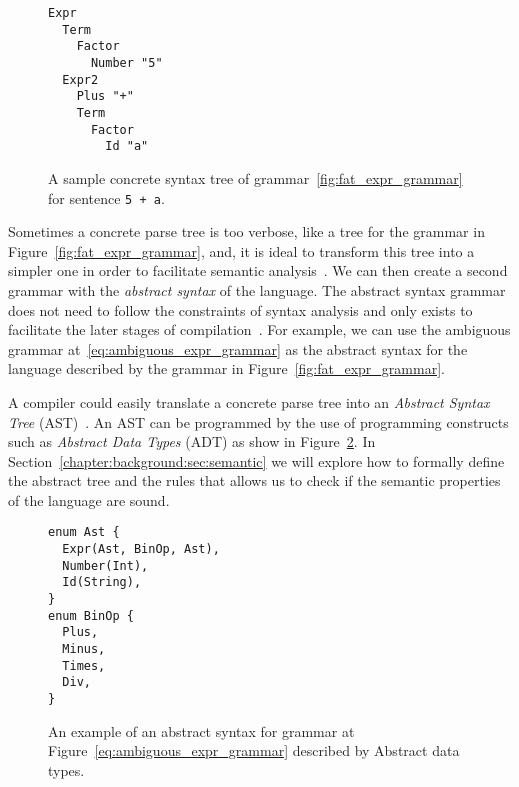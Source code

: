 \documentclass[
  oneside,
  english,
  coorientadorbanca,
  noabntexcite
]{ufsc-thesis-rn46-2019}
\newcommand{\code}[1]{\texttt{#1}}
\begin{document}
\begin{figure}[ht]
  \centering
  \begin{minipage}{0.5\textwidth}
    \begin{verbatim}
Expr
  Term
    Factor
      Number "5"
  Expr2
    Plus "+"
    Term
      Factor
        Id "a"
    \end{verbatim}
  \end{minipage}
  \caption{
    A sample concrete syntax tree of grammar~\ref{fig:fat_expr_grammar} for sentence \code{5 + a}.
  }\label{fig:concrete_syntax_tree}
\end{figure}

Sometimes a concrete parse tree is too verbose, like a tree for the grammar in Figure~\ref{fig:fat_expr_grammar}, and, it is ideal to transform this tree into a simpler one in order to facilitate semantic analysis~\cite{appel2003modern}.
We can then create a second grammar with the \textit{abstract syntax} of the language.
The abstract syntax grammar does not need to follow the constraints of syntax analysis and only exists to facilitate the later stages of compilation~\cite{appel2003modern}.
For example, we can use the ambiguous grammar at~\eqref{eq:ambiguous_expr_grammar} as the abstract syntax for the language described by the grammar in Figure~\ref{fig:fat_expr_grammar}.

A compiler could easily translate a concrete parse tree into an \textit{Abstract Syntax Tree} (AST)~\cite{appel2003modern}.
An AST can be programmed by the use of programming constructs such as \textit{Abstract Data Types} (ADT) as show in Figure~\ref{fig:abstract_syntax_adt}.
In Section~\ref{chapter:background:sec:semantic} we will explore how to formally define the abstract tree and the rules that allows us to check if the semantic properties of the language are sound.

\begin{figure}[ht]
  \centering
  \begin{minipage}{0.6\textwidth}
    \begin{verbatim}
enum Ast {
  Expr(Ast, BinOp, Ast),
  Number(Int),
  Id(String),
}
enum BinOp {
  Plus,
  Minus,
  Times,
  Div,
}
    \end{verbatim}
  \end{minipage}
  \caption{
    An example of an abstract syntax for grammar at Figure~\eqref{eq:ambiguous_expr_grammar} described by Abstract data types.
  }\label{fig:abstract_syntax_adt}
\end{figure}
\end{document}
